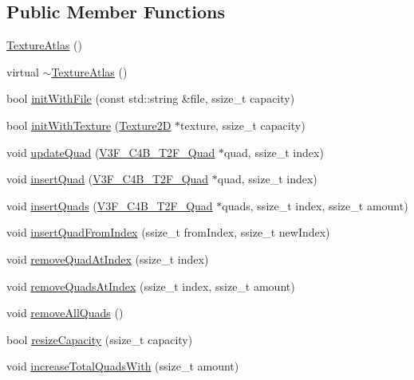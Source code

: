 \subsection*{Public Member Functions}
\begin{DoxyCompactItemize}
\item 
\hyperlink{classTextureAtlas_aa1c27b7bd19453c4c84f1aa8993450ec}{Texture\+Atlas} ()
\item 
virtual \hyperlink{classTextureAtlas_aed47504c1211eacc876b643e766365d1}{$\sim$\+Texture\+Atlas} ()
\item 
bool \hyperlink{classTextureAtlas_a325b82009a3ae2ec31ac42374eed1ab6}{init\+With\+File} (const std\+::string \&file, ssize\+\_\+t capacity)
\item 
bool \hyperlink{classTextureAtlas_a44ea8a3d38f0e758e33c6b10c725b44b}{init\+With\+Texture} (\hyperlink{classTexture2D}{Texture2D} $\ast$texture, ssize\+\_\+t capacity)
\item 
void \hyperlink{classTextureAtlas_a3811e75915851fc5035804f3ecc5423e}{update\+Quad} (\hyperlink{structV3F__C4B__T2F__Quad}{V3\+F\+\_\+\+C4\+B\+\_\+\+T2\+F\+\_\+\+Quad} $\ast$quad, ssize\+\_\+t index)
\item 
void \hyperlink{classTextureAtlas_a7dc5079e603e3b7e78e73a1094d1560b}{insert\+Quad} (\hyperlink{structV3F__C4B__T2F__Quad}{V3\+F\+\_\+\+C4\+B\+\_\+\+T2\+F\+\_\+\+Quad} $\ast$quad, ssize\+\_\+t index)
\item 
void \hyperlink{classTextureAtlas_ab80aca4252af179afcbc6e23208407f5}{insert\+Quads} (\hyperlink{structV3F__C4B__T2F__Quad}{V3\+F\+\_\+\+C4\+B\+\_\+\+T2\+F\+\_\+\+Quad} $\ast$quads, ssize\+\_\+t index, ssize\+\_\+t amount)
\item 
void \hyperlink{classTextureAtlas_a5808a77487d3f789156a93ceb18df85b}{insert\+Quad\+From\+Index} (ssize\+\_\+t from\+Index, ssize\+\_\+t new\+Index)
\item 
void \hyperlink{classTextureAtlas_a67ab93a008f52e7d204ae8a402f71a9b}{remove\+Quad\+At\+Index} (ssize\+\_\+t index)
\item 
void \hyperlink{classTextureAtlas_ab1c31f38025e77b95050fd798bd76919}{remove\+Quads\+At\+Index} (ssize\+\_\+t index, ssize\+\_\+t amount)
\item 
void \hyperlink{classTextureAtlas_aff17a9d95e8b279381d4b4820d0893f4}{remove\+All\+Quads} ()
\item 
bool \hyperlink{classTextureAtlas_a2df218231fad90b00cbf5f7b8de2ecdf}{resize\+Capacity} (ssize\+\_\+t capacity)
\item 
void \hyperlink{classTextureAtlas_a69818ba2fc5488effec077ff3a3a506c}{increase\+Total\+Quads\+With} (ssize\+\_\+t amount)

\end{DoxyCompactItemize}
